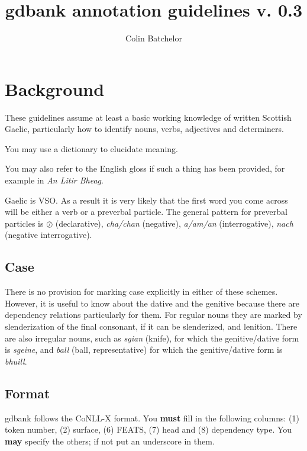 \documentclass[a4paper]{article}
\begin{document}
\title{gdbank annotation guidelines v. 0.3}
\author{Colin Batchelor}
\maketitle

\section{Background}

These guidelines assume at least a basic working knowledge of written Scottish Gaelic, particularly how to identify nouns, verbs, adjectives and determiners.

 You may use a dictionary to elucidate meaning.

 You may also refer to the English gloss if such a thing has been provided, for example in {\it An Litir Bheag}.

 Gaelic is VSO. As a result it is very likely that the first word you come across will be either a verb or a preverbal particle.
The general pattern for preverbal particles is $\oslash$ (declarative), \textit{cha/chan} (negative), \textit{a/am/an} (interrogative), \textit{nach} (negative interrogative).





\subsection{Case}

There is no provision for marking case explicitly in either of these schemes.
However, it is useful to know about the dative and the genitive because there are dependency relations particularly for them.
For regular nouns they are marked by slenderization of the final consonant, if it can be slenderized, and lenition.
There are also irregular nouns, such as \textit{sgian} (knife), for which the genitive/dative form is \textit{sgeine}, and \textit{ball} (ball, representative) for which the genitive/dative form is \textit{bhuill}.

\subsection{Format}

 gdbank follows the CoNLL-X format.
You \textbf{must} fill in the following columns: (1) token number, (2) surface, (6) FEATS, (7) head and (8) dependency type.
You \textbf{may} specify the others; if not put an underscore in them.
\end{document}
